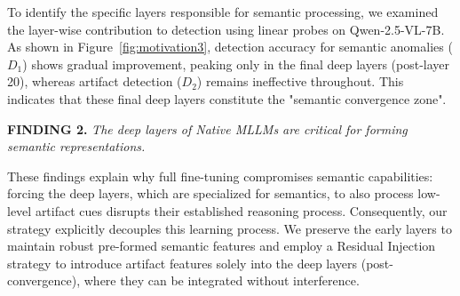 \documentclass{article}
\theoremstyle{plain}
\theoremstyle{definition}
\theoremstyle{remark}
\begin{document}
To identify the specific layers responsible for semantic processing, we examined the layer-wise contribution to detection using linear probes on Qwen-2.5-VL-7B.
As shown in Figure~\ref{fig:motivation3}, detection accuracy for semantic anomalies ($D_1$) shows gradual improvement, peaking only in the final deep layers (post-layer 20), whereas artifact detection ($D_2$) remains ineffective throughout.
This indicates that these final deep layers constitute the "semantic convergence zone".
\begin{simplebox} 
  \footnotesize \textbf{FINDING 2.} \textit{The deep layers of Native MLLMs are critical for forming semantic representations.} 
\end{simplebox}
These findings explain why full fine-tuning compromises semantic capabilities: forcing the deep layers, which are specialized for semantics, to also process low-level artifact cues disrupts their established reasoning process. Consequently, our strategy explicitly decouples this learning process. 
We preserve the early layers to maintain robust pre-formed semantic features and employ a Residual Injection strategy to introduce artifact features solely into the deep layers (post-convergence), where they can be integrated without interference.
\end{document}
